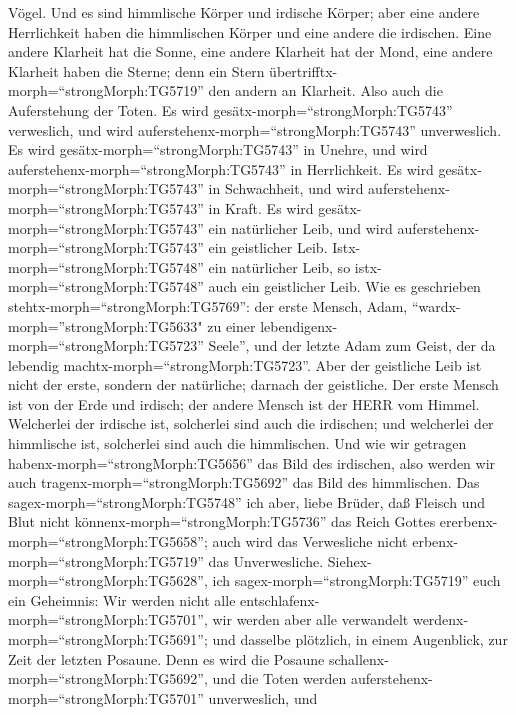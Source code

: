 Vögel.  Und es sind himmlische Körper und irdische Körper;
aber eine andere Herrlichkeit haben die himmlischen Körper und eine
andere die irdischen.  Eine andere Klarheit hat die Sonne,
eine andere Klarheit hat der Mond, eine andere Klarheit haben die
Sterne; denn ein Stern übertrifftx-morph=``strongMorph:TG5719'' den
andern an Klarheit.  Also auch die Auferstehung der Toten.
Es wird gesätx-morph=``strongMorph:TG5743'' verweslich, und wird
auferstehenx-morph=``strongMorph:TG5743'' unverweslich.  Es
wird gesätx-morph=``strongMorph:TG5743'' in Unehre, und wird
auferstehenx-morph=``strongMorph:TG5743'' in Herrlichkeit. Es wird
gesätx-morph=``strongMorph:TG5743'' in Schwachheit, und wird
auferstehenx-morph=``strongMorph:TG5743'' in Kraft.  Es
wird gesätx-morph=``strongMorph:TG5743'' ein natürlicher Leib, und wird
auferstehenx-morph=``strongMorph:TG5743'' ein geistlicher Leib.
Istx-morph=``strongMorph:TG5748'' ein natürlicher Leib, so
istx-morph=``strongMorph:TG5748'' auch ein geistlicher Leib.
 Wie es geschrieben stehtx-morph=``strongMorph:TG5769'':
der erste Mensch, Adam, ``wardx-morph=''strongMorph:TG5633" zu einer
lebendigenx-morph=``strongMorph:TG5723'' Seele'', und der letzte Adam
zum Geist, der da lebendig machtx-morph=``strongMorph:TG5723''.
 Aber der geistliche Leib ist nicht der erste, sondern der
natürliche; darnach der geistliche.  Der erste Mensch ist
von der Erde und irdisch; der andere Mensch ist der HERR vom Himmel.
 Welcherlei der irdische ist, solcherlei sind auch die
irdischen; und welcherlei der himmlische ist, solcherlei sind auch die
himmlischen.  Und wie wir getragen
habenx-morph=``strongMorph:TG5656'' das Bild des irdischen, also werden
wir auch tragenx-morph=``strongMorph:TG5692'' das Bild des himmlischen.
 Das sagex-morph=``strongMorph:TG5748'' ich aber, liebe
Brüder, daß Fleisch und Blut nicht könnenx-morph=``strongMorph:TG5736''
das Reich Gottes ererbenx-morph=``strongMorph:TG5658''; auch wird das
Verwesliche nicht erbenx-morph=``strongMorph:TG5719'' das Unverwesliche.
 Siehex-morph=``strongMorph:TG5628'', ich
sagex-morph=``strongMorph:TG5719'' euch ein Geheimnis: Wir werden nicht
alle entschlafenx-morph=``strongMorph:TG5701'', wir werden aber alle
verwandelt werdenx-morph=``strongMorph:TG5691'';  und
dasselbe plötzlich, in einem Augenblick, zur Zeit der letzten Posaune.
Denn es wird die Posaune schallenx-morph=``strongMorph:TG5692'', und die
Toten werden auferstehenx-morph=``strongMorph:TG5701'' unverweslich, und
